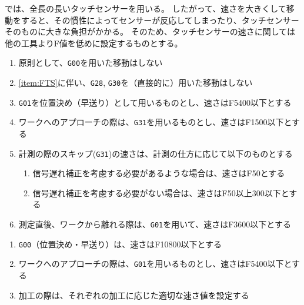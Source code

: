 


\DMname では、全長の長いタッチセンサーを用いる。
したがって、速さを大きくして移動をすると、その慣性によってセンサーが反応してしまったり、タッチセンサーそのものに大きな負担がかかる。
そのため、タッチセンサーの速さに関しては他の工具よりF値を低めに設定するものとする。


\begin{enumerate}[label=\Roman*., ref=\Roman*]
\item\label{item:FTS} 原則として、\verb|G00|を用いた移動はしない
\item \ref{item:FTS}に伴い、\verb|G28|, \verb|G30|を（直接的に）用いた移動はしない
\item \verb|G01|を位置決め（早送り）として用いるものとし、速さはF5400以下とする
\item ワークへのアプローチの際は、\verb|G31|を用いるものとし、速さはF1500以下とする
\item 計測の際のスキップ(\verb|G31|)の速さは、計測の仕方に応じて以下のものとする
  \begin{enumerate}
  \item 信号遅れ補正を考慮する必要があるような場合は、速さはF50とする
  \item 信号遅れ補正を考慮する必要がない場合は、速さはF50以上300以下とする
  \end{enumerate}
\item 測定直後、ワークから離れる際は、\verb|G01|を用いて、速さはF3600以下とする
\end{enumerate}



\begin{enumerate}[label=\Roman*., ref=\Roman*]
\item \verb|G00|（位置決め・早送り）は、速さはF10800以下とする
\item ワークへのアプローチの際は、\verb|G01|を用いるものとし、速さはF5400以下とする
\item 加工の際は、それぞれの加工に応じた適切な速さ値を設定する
\end{enumerate}
